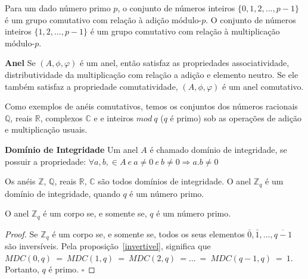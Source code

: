 \begin{example}
Para um dado número primo $p$, o conjunto de números inteiros $\{0, 1, 2, . . . , p - 1\}$ é um grupo comutativo com relação à adição módulo-$p$. O conjunto de números inteiros $\{1, 2, . . . , p - 1\}$ é um grupo comutativo com relação à multiplicação módulo-$p$.
\end{example}

\begin{definition} {\bf Anel} \label{anel}  Se $(A, \phi, \varphi)$ é um anel, então satisfaz as propriedades associatividade, distributividade da multiplicação com relação a adição e elemento neutro. Se ele também satisfaz a propriedade comutatividade, $(A, \phi, \varphi)$ é um anel comutativo.
\end{definition}

\begin{example}
Como exemplos de anéis comutativos, temos os conjuntos dos números racionais $\mathbb{Q}$, reais $\mathbb{R}$, complexos $\mathbb{C}$ e e inteiros $mod\ q$ ($q$ é primo) sob as operações de adição e multiplicação usuais.
\end{example}

\begin{definition} {\bf Domínio de Integridade} \label{DomInt}  Um anel $A$ é chamado domínio de integridade, se possuir a propriedade: $\forall a,b, \in A\ e\ a\neq 0\ e\ b \neq 0 \Longrightarrow a.b \neq 0$
\end{definition}

\begin{example} Os anéis $\mathbb{Z}$, $\mathbb{Q}$, reais $\mathbb{R}$, $\mathbb{C}$ são todos domínios de integridade. O anel $\mathbb{Z}_q$ é um domínio de integridade, quando $q$ é um número primo.
\end{example}

\begin{theorem} O anel $\mathbb{Z}_q$  é um corpo se, e somente se, $q$ é um número primo.
\end{theorem}

\begin{proof}
Se $\mathbb{Z}_q$ é um corpo se, e somente se, todos os seus elementos $\bar{0}, \bar{1}, \ldots , \overline{q-1}$ são inversíveis. Pela proposição~\ref{invertivel}, significa que  $MDC(0,q)\ =\ MDC(1,q)\ =\ MDC(2,q)\ = \ldots \ =\ MDC(q-1,q)\ =\ 1$. Portanto, $q$ é primo. $\square$
\end{proof}

